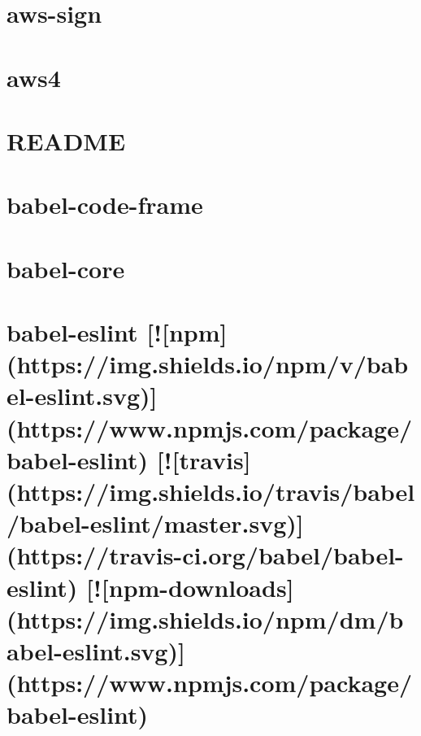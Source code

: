 \documentclass[twoside]{book}
\newcommand{\+}{\discretionary{\mbox{\scriptsize$\hookleftarrow$}}{}{}}
\begin{document}
\chapter{aws-\/sign}
\label{md__c_1_workspace_demo_src_main_script_node_modules_aws-sign2__r_e_a_d_m_e}

\chapter{aws4}
\label{md__c_1_workspace_demo_src_main_script_node_modules_aws4__r_e_a_d_m_e}

\chapter{R\+E\+A\+D\+ME}
\label{md__c_1_workspace_demo_src_main_script_node_modules_axobject-query__r_e_a_d_m_e}

\chapter{babel-\/code-\/frame}
\label{md__c_1_workspace_demo_src_main_script_node_modules_babel-code-frame__r_e_a_d_m_e}

\chapter{babel-\/core}
\label{md__c_1_workspace_demo_src_main_script_node_modules_babel-core__r_e_a_d_m_e}

\chapter{babel-\/eslint \mbox{[}!\mbox{[}npm\mbox{]}(https\+://img.shields.\+io/npm/v/babel-\/eslint.svg)\mbox{]}(https\+://www.npmjs.\+com/package/babel-\/eslint) \mbox{[}!\mbox{[}travis\mbox{]}(https\+://img.shields.\+io/travis/babel/babel-\/eslint/master.svg)\mbox{]}(https\+://travis-\/ci.org/babel/babel-\/eslint) \mbox{[}!\mbox{[}npm-\/downloads\mbox{]}(https\+://img.shields.\+io/npm/dm/babel-\/eslint.svg)\mbox{]}(https\+://www.npmjs.\+com/package/babel-\/eslint)}
\label{md__c_1_workspace_demo_src_main_script_node_modules_babel-eslint__r_e_a_d_m_e}

\end{document}
